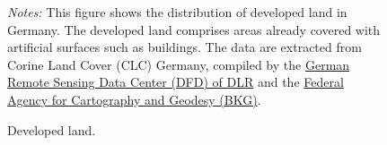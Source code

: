 \documentclass[
  12pt,
]{article}
\begin{document}
\begin{figure}


\caption{\label{fig-developed-land}Developed
land.}
\begin{minipage}{0.975\textwidth}
\small
\emph{Notes:} This figure shows the
distribution of developed land in Germany. The developed land comprises
areas already covered with artificial surfaces such as buildings. The
data are extracted from Corine Land Cover (CLC) Germany, compiled by the
\href{https://www.dlr.de/eoc/en/desktopdefault.aspx/tabid-11882/20871_read-48836}{German
Remote Sensing Data Center (DFD) of DLR} and the
\href{https://www.bkg.bund.de}{Federal Agency for Cartography and
Geodesy (BKG)}.
\end{minipage}


\end{figure}%


\end{document}
